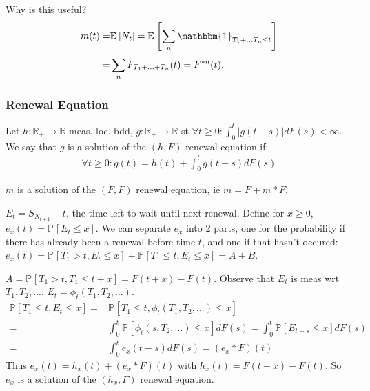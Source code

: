 Why is this useful?
\begin{align}
	m(t) =& \mathbb{E}_{} \left[ N_t \right] = \mathbb{E}_{} \left[ \sum_{n}^{} \mathbbm{1}_{T_1+...T_n \leq t} \right] \\
	=& \sum_{n}^{} F_{T_1 +...+T_n} (t) = F^{*n}(t).
\end{align}

\subsubsection{Renewal Equation}
\begin{defn}
	Let $h:\mathbb{R}_+ \to \mathbb{R}$ meas. loc. bdd, $g:\mathbb{R}_+ \to \mathbb{R}$ st $ \forall t\geq 0: \int_{0}^{t} |g(t-s)|dF(s) <\infty$. We say that $g$ is a solution of the $(h,F)$ renewal equation if:
\begin{align}
	\forall t\geq 0: g(t) = h(t) + \int_{0}^{t} g(t-s)dF(s)
\end{align}
\end{defn}

\begin{prop}
	$m$ is a solution of the $(F,F)$ renewal equation, ie $m=F+m*F$.	
\end{prop}

\begin{ex}
	$E_t = S_{N_{t+1}}-t$, the time left to wait until next renewal. Define for  $x \geq 0$, $e_x(t) = \mathbb{P}_{} \left[ E_t \leq x \right] $. We can separate $e_x$ into 2 parts, one for the probability if there has already been a renewal before time $t$, and one if that hasn't occured: $e_x(t) = \mathbb{P}_{} \left[ T_1 > t, E_t \leq x \right]  + \mathbb{P}_{} \left[ T_1 \leq t, E_t \leq x \right]  = A + B$.

	$A = \mathbb{P}_{} \left[ T_1 > t, T_1 \leq t+x \right] = F(t+x)-F(t)$. Observe that $E_t$ is meas wrt $T_1, T_2,...$. $E_t = \phi_t(T_1,T_2,...)$. 
\begin{align}
	\mathbb{P}_{} \left[ T_1 \leq t, E_t \leq x \right] =& \mathbb{P}_{} \left[ T_1 \leq t, \phi_t(T_1,T_2,...) \leq x \right] \\ 
	=& \int_{0}^{t} \mathbb{P}_{} \left[ \phi_t(s, T_2,...) \leq x \right] dF(s) = \int_{0}^{t} \mathbb{P}_{} \left[ E_{t-s} \leq x \right] dF(s) \\
	=& \int_{0}^{t} e_x(t-s) dF(s) = (e_x * F)(t)
\end{align}
Thus $e_x(t) = h_x(t) + (e_x * F)(t)$ with $h_x(t) = F(t+x)-F(t)$. So  $e_x$ is a solution of the $(h_x,F)$ renewal equation.
\end{ex}

